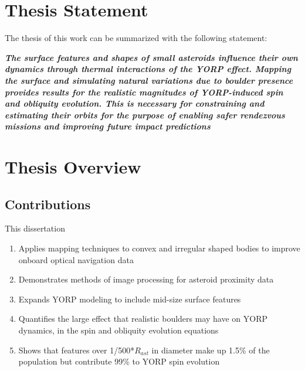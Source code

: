 \section{Thesis Statement}
The thesis of this work can be summarized with the following statement:

\begin{center}
\textbf{\it{The surface features and shapes of small asteroids influence their own dynamics through thermal interactions of the YORP effect. Mapping the surface and simulating natural variations due to boulder presence provides results for the realistic magnitudes of YORP-induced spin and obliquity evolution. This is necessary for constraining and estimating their orbits for the purpose of enabling safer rendezvous missions and improving future impact predictions}}
\end{center}

\section{Thesis Overview}
\subsection{Contributions}
This dissertation
\begin{enumerate}
    \item Applies mapping techniques to convex and irregular shaped bodies to improve onboard optical navigation data
    \item Demonstrates methods of image processing for asteroid proximity data
    \item Expands YORP modeling to include mid-size surface features
    \item Quantifies the large effect that realistic boulders may have on YORP dynamics, in the spin and obliquity evolution equations
    \item Shows that features over 1/500*$R_{ast}$ in diameter make up 1.5\% of the population but contribute 99\% to YORP spin evolution  
\end{enumerate}


























